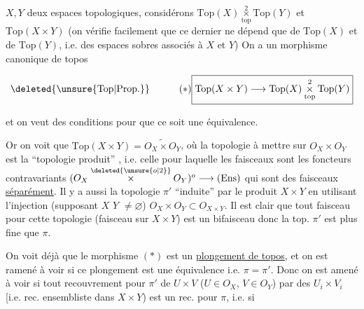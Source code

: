 $X,Y$ deux espaces topologiques, considérons $\mathrm{Top}(X)\mathbin{\underset{\mathrm{top}}{\overset{2}{\times}}}\mathrm{Top}(Y)$ et $\mathrm{Top}(X\times Y)$ (on vérifie facilement que ce dernier ne dépend que de $\mathrm{Top}(X)$ et de $\mathrm{Top}(Y)$, i.e. des  espaces sobres associés à $X$ et $Y$) On a un morphisme canonique de topos

\[
\deleted{\unsure{\mathrm{Top}|\mathrm{Prop.}}}\quad\tag*{\ensuremath{(*)}}\boxed{\mathrm{Top}(X\times Y)\longrightarrow\mathrm{Top}(X)\mathbin{\underset{\mathrm{top}}{\overset{2}{\times}}}\mathrm{Top}(Y)}
\]

et on veut des conditions pour que ce soit une équivalence.


Or on voit que $\mathrm{Top}(X\times Y)=\widetilde{O_X\times O_Y}$, où la topologie à mettre sur $O_X\times O_Y$ est la ``topologie produit'' \inserted{$\pi$}, i.e. celle pour laquelle les faisceaux sont les foncteurs contravariants $(O_X\mathbin{\overset{\deleted{\unsure{o|2}}}{\times}}O_Y)^o\longrightarrow(\mathrm{Ens})$ qui sont des faisceaux \uline{séparément}.  Il y a aussi la topologie $\pi'$  ``induite'' par le produit $X\times Y$ en utilisant l'injection (supposant $X$  $Y$ \deleted{\unsure{=}} $\ne\varnothing$) $O_X\times O_Y\subset O_{X\times Y}$. Il est clair que tout faisceau pour cette topologie (faisceau sur $X\times Y$) est un bifaisceau  donc la top. $\pi'$ est plus fine que $\pi$.


On voit déjà que le  morphisme $(*)$ est un \uline{plongement de topos}, et on est ramené à voir si ce plongement est une équivalence i.e. $\pi=\pi'$. Donc on est amené à voir si tout recouvrement pour $\pi'$ de $U\times V$ ($U\in O_X$, $V\in O_Y$) par des $U_i\times V_i$ [i.e. rec. ensembliste dans $X\times Y$) est un rec. pour $\pi$, i.e.  si


